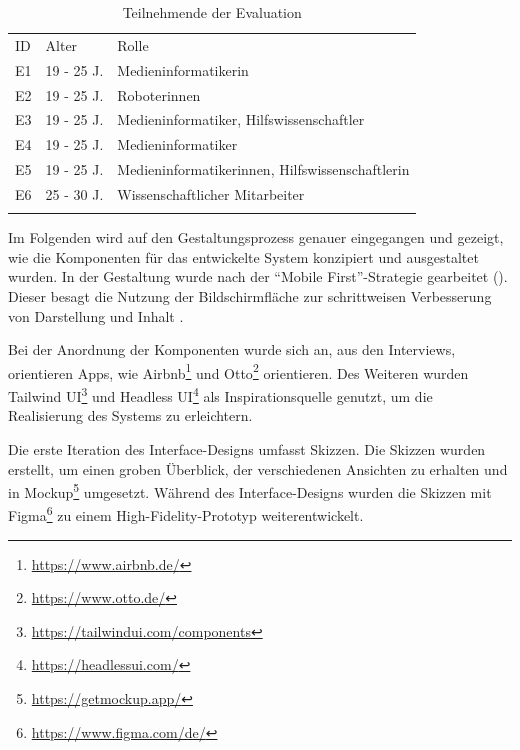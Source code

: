 \begin{table}[h]
    \centering
    \caption{Teilnehmende der Evaluation}
    \begin{tabular}{lll}
            \arrayrulecolor{maincolor}\hline
            \sffamily\color{maincolor}ID & \sffamily\color{maincolor}Alter &
            \sffamily\color{maincolor}Rolle \\
            \arrayrulecolor{maincolor}\hline
            E1                           & 19 - 25 J.                      &
            Medieninformatikerin                     \\
            E2                           & 19 - 25 J.                      & Roboterinnen \\
            E3                           & 19 - 25 J.                      & Medieninformatiker, Hilfswissenschaftler        \\
            E4                          & 19 - 25 J.                      & Medieninformatiker \\
            E5                           & 19 - 25 J.                      &
            Medieninformatikerinnen, Hilfswissenschaftlerin \\
            E6                           & 25 - 30 J.                      & Wissenschaftlicher Mitarbeiter        \\
            \arrayrulecolor{maincolor}\hline
    \end{tabular}
    \label{table:e}
\end{table}

Im Folgenden wird auf den Gestaltungsprozess genauer eingegangen und gezeigt, wie die Komponenten
für das entwickelte System konzipiert und ausgestaltet wurden. In der Gestaltung wurde nach der
\enquote{Mobile First}-Strategie gearbeitet (). Dieser besagt die Nutzung der
Bildschirmfläche zur schrittweisen Verbesserung von Darstellung und Inhalt \cite{kim_chapter_2013}.

Bei der Anordnung der Komponenten wurde sich an, aus den Interviews, orientieren Apps, wie
Airbnb\footnote{\url{https://www.airbnb.de/}} und Otto\footnote{\url{https://www.otto.de/}}
orientieren. Des Weiteren wurden Tailwind UI\footnote{\url{https://tailwindui.com/components}} und
Headless UI\footnote{\url{https://headlessui.com/}} als Inspirationsquelle genutzt, um die
Realisierung des Systems zu erleichtern. 

Die erste Iteration des Interface-Designs umfasst Skizzen. Die Skizzen wurden erstellt, um einen
groben Überblick, der verschiedenen Ansichten zu erhalten und in
Mockup\footnote{\url{https://getmockup.app/}} umgesetzt. Während des Interface-Designs wurden die
Skizzen mit Figma\footnote{\url{https://www.figma.com/de/}} zu einem High-Fidelity-Prototyp weiterentwickelt.

